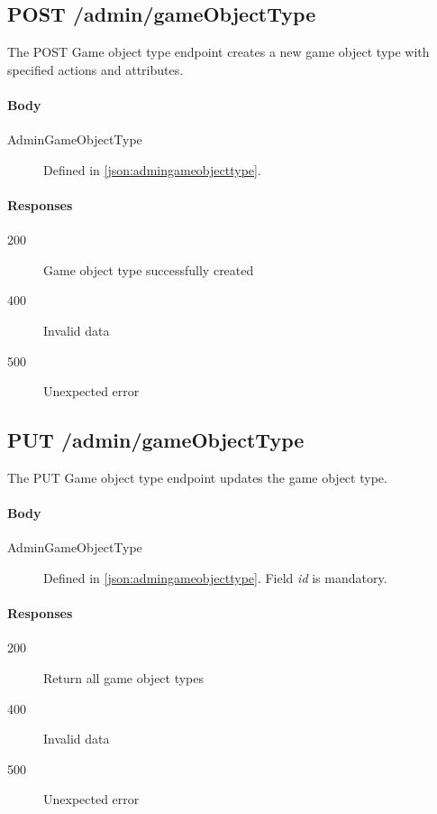 	\subsection{POST /admin/gameObjectType}
	The POST Game object type endpoint creates a new game object type with specified actions and attributes. 
		\paragraph*{Body}
			\begin{description}
				\item[AdminGameObjectType] Defined in \ref{json:admingameobjecttype}.
			\end{description}
		\paragraph*{Responses}
			\begin{description}		
				\item[200] Game object type successfully created
				\item[400] Invalid data
				\item[500] Unexpected error
			\end{description}
			
	\subsection{PUT /admin/gameObjectType}
	The PUT Game object type endpoint updates the game object type.
		\paragraph*{Body}
			\begin{description}
				\item[AdminGameObjectType] Defined in \ref{json:admingameobjecttype}. Field \textit{id} is mandatory.
			\end{description}
		\paragraph*{Responses}
			\begin{description}		
				\item[200] Return all game object types
				\item[400] Invalid data
				\item[500] Unexpected error
			\end{description}			
				


